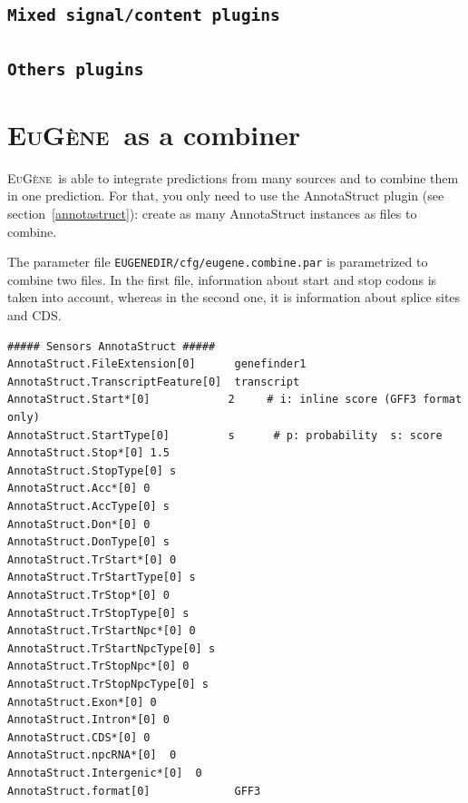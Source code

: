 \documentclass[a4paper,titlepage]{report}
\newcommand{\EuGene}{\textsc{EuG\`ene}}
\begin{document}
\subsection{\texttt{Mixed signal/content plugins}}





\subsection{\texttt{Others plugins}}





\section{\EuGene\ as a combiner}

\EuGene\ is able to integrate predictions from many sources and to combine them in one prediction.
For that, you only need to use the AnnotaStruct plugin (see section~\ref{annotastruct}): create as many AnnotaStruct instances as files to combine.


The parameter file \texttt{EUGENEDIR/cfg/eugene.combine.par} is parametrized to combine two files. 
In the first file, information about start and stop codons is taken into account, whereas in the second one, it is information about splice sites and CDS.
\begin{Verbatim}[fontsize=\small]
 ##### Sensors AnnotaStruct #####
AnnotaStruct.FileExtension[0]      genefinder1
AnnotaStruct.TranscriptFeature[0]  transcript
AnnotaStruct.Start*[0]            2     # i: inline score (GFF3 format only) 
AnnotaStruct.StartType[0]         s      # p: probability  s: score
AnnotaStruct.Stop*[0] 1.5
AnnotaStruct.StopType[0] s
AnnotaStruct.Acc*[0] 0
AnnotaStruct.AccType[0] s
AnnotaStruct.Don*[0] 0
AnnotaStruct.DonType[0] s
AnnotaStruct.TrStart*[0] 0
AnnotaStruct.TrStartType[0] s
AnnotaStruct.TrStop*[0] 0
AnnotaStruct.TrStopType[0] s
AnnotaStruct.TrStartNpc*[0] 0
AnnotaStruct.TrStartNpcType[0] s
AnnotaStruct.TrStopNpc*[0] 0
AnnotaStruct.TrStopNpcType[0] s
AnnotaStruct.Exon*[0] 0
AnnotaStruct.Intron*[0] 0
AnnotaStruct.CDS*[0] 0
AnnotaStruct.npcRNA*[0]  0
AnnotaStruct.Intergenic*[0]  0
AnnotaStruct.format[0]             GFF3
\end{Verbatim}
\end{document}
